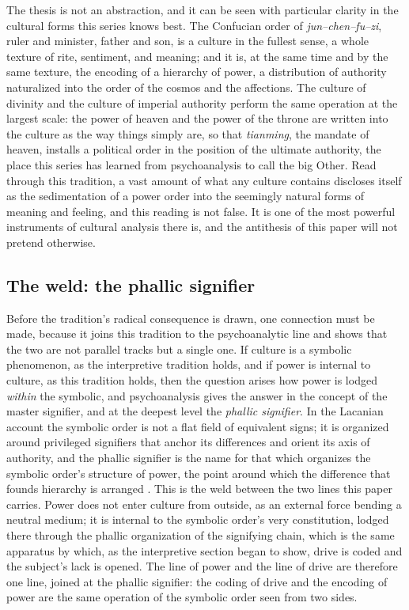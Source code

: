 The thesis is not an abstraction, and it can be seen with particular clarity in the cultural forms this series knows best. The Confucian order of \emph{jun--chen--fu--zi}, ruler and minister, father and son, is a culture in the fullest sense, a whole texture of rite, sentiment, and meaning; and it is, at the same time and by the same texture, the encoding of a hierarchy of power, a distribution of authority naturalized into the order of the cosmos and the affections. The culture of divinity and the culture of imperial authority perform the same operation at the largest scale: the power of heaven and the power of the throne are written into the culture as the way things simply are, so that \emph{tianming}, the mandate of heaven, installs a political order in the position of the ultimate authority, the place this series has learned from psychoanalysis to call the big Other. Read through this tradition, a vast amount of what any culture contains discloses itself as the sedimentation of a power order into the seemingly natural forms of meaning and feeling, and this reading is not false. It is one of the most powerful instruments of cultural analysis there is, and the antithesis of this paper will not pretend otherwise.

\subsection*{The weld: the phallic signifier}

Before the tradition's radical consequence is drawn, one connection must be made, because it joins this tradition to the psychoanalytic line and shows that the two are not parallel tracks but a single one. If culture is a symbolic phenomenon, as the interpretive tradition holds, and if power is internal to culture, as this tradition holds, then the question arises how power is lodged \emph{within} the symbolic, and psychoanalysis gives the answer in the concept of the master signifier, and at the deepest level the \emph{phallic signifier}. In the Lacanian account the symbolic order is not a flat field of equivalent signs; it is organized around privileged signifiers that anchor its differences and orient its axis of authority, and the phallic signifier is the name for that which organizes the symbolic order's structure of power, the point around which the difference that founds hierarchy is arranged \parencite{lacan2006ecrits}. This is the weld between the two lines this paper carries. Power does not enter culture from outside, as an external force bending a neutral medium; it is internal to the symbolic order's very constitution, lodged there through the phallic organization of the signifying chain, which is the same apparatus by which, as the interpretive section began to show, drive is coded and the subject's lack is opened. The line of power and the line of drive are therefore one line, joined at the phallic signifier: the coding of drive and the encoding of power are the same operation of the symbolic order seen from two sides.


